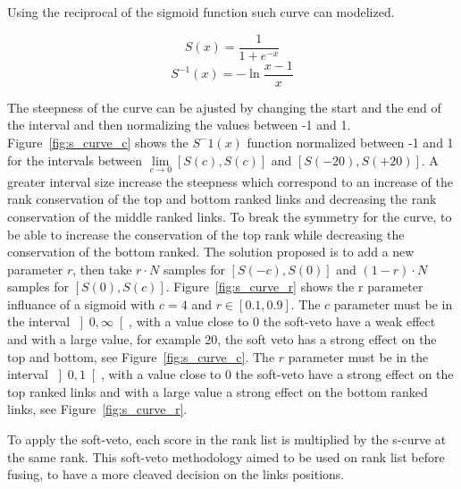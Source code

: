 Using the reciprocal of the sigmoid function such curve can modelized.

\begin{equation}
  \label{eq:sigmoid}
  S(x) = \frac{1}{1+e^{-x}}
\end{equation}
\begin{equation}
  \label{eq:sigmoid_r}
  S^{-1}(x) = -\ln{\frac{x-1}{x}}
\end{equation}

The steepness of the curve can be ajusted by changing the start and the end of the interval and then normalizing the values between -1 and 1.
Figure~\ref{fig:s_curve_c} shows the $S^-1(x)$ function normalized between -1 and 1 for the intervals between $\lim\limits_{c \rightarrow 0} \left[S(c), S(c)\right]$ and $\left[S(-20), S(+20)\right]$.
A greater interval size increase the steepness which correspond to an increase of the rank conservation of the top and bottom ranked links and decreasing the rank conservation of the middle ranked links.
To break the symmetry for the curve, to be able to increase the conservation of the top rank while decreasing the conservation of the bottom ranked.
The solution proposed is to add a new parameter $r$, then take $r \cdot N$ samples for $\left[S(-c), S(0)\right]$ and $(1-r) \cdot N$ samples for $\left[S(0), S(c)\right]$.
Figure~\ref{fig:s_curve_r} shows the r parameter influance of a sigmoid with $c = 4$ and $r \in \left[0.1, 0.9\right]$.
The $c$ parameter must be in the interval $\left]0, \infty\right[$, with a value close to $0$ the soft-veto have a weak effect and with a large value, for example 20, the soft veto has a strong effect on the top and bottom, see Figure~\ref{fig:s_curve_c}.
The $r$ parameter must be in the interval $\left]0, 1\right[$, with a value close to $0$ the soft-veto have a strong effect on the top ranked links and with a large value a strong effect on the bottom ranked links, see Figure~\ref{fig:s_curve_r}.

To apply the soft-veto, each score in the rank list is multiplied by the s-curve at the same rank.
This soft-veto methodology aimed to be used on rank list before fusing, to have a more cleaved decision on the links positions.

